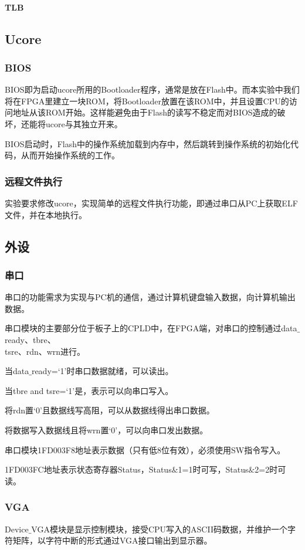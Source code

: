 \paragraph{TLB}

\subsection{Ucore}
\subsubsection{BIOS}
BIOS即为启动ucore所用的Bootloader程序，通常是放在Flash中。而本实验中我们将在FPGA里建立一块ROM，将Bootloader放置在该ROM中，并且设置CPU的访问地址从该ROM开始。这样能避免由于Flash的读写不稳定而对BIOS造成的破坏，还能将ucore与其独立开来。

BIOS启动时，Flash中的操作系统加载到内存中，然后跳转到操作系统的初始化代码，从而开始操作系统的工作。
\subsubsection{远程文件执行}
实验要求修改ucore，实现简单的远程文件执行功能，即通过串口从PC上获取ELF文件，并在本地执行。
\subsection{外设}
\subsubsection{串口}
串口的功能需求为实现与PC机的通信，通过计算机键盘输入数据，向计算机输出数据。

串口模块的主要部分位于板子上的CPLD中，在FPGA端，对串口的控制通过data$\_$ready、tbre、\\
tsre、rdn、wrn进行。

当data$\_$ready=‘1’时串口数据就绪，可以读出。

当tbre and tsre=‘1’是，表示可以向串口写入。

将rdn置‘0’且数据线写高阻，可以从数据线得出串口数据。

将数据写入数据线且将wrn置‘0’，可以向串口发出数据。

串口模块1FD003F8地址表示数据（只有低8位有效），必须使用SW指令写入。

1FD003FC地址表示状态寄存器Status，Status$\&$1=1时可写，Status$\&$2=2时可读。
\subsubsection{VGA}
Device$\_$VGA模块是显示控制模块，接受CPU写入的ASCII码数据，并维护一个字符矩阵，以字符中断的形式通过VGA接口输出到显示器。

